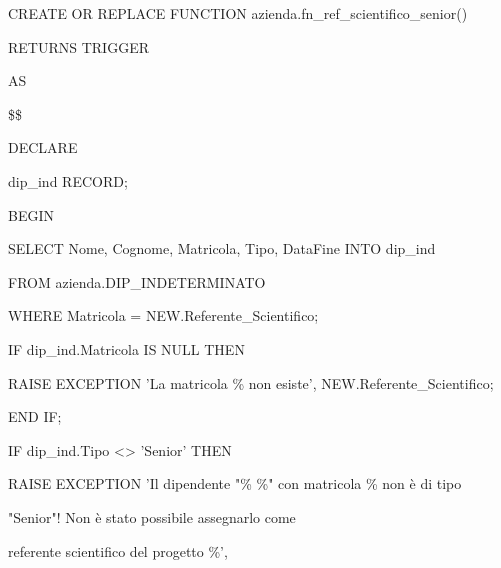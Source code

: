     \ttfamily
        \begin{flushleft}
            \begin{description}
                \item CREATE OR REPLACE FUNCTION azienda.fn\_ref\_scientifico\_senior()
                \item RETURNS TRIGGER
                \item AS
                \item \$\$
                \item DECLARE
                \begin{description}
                    \item dip\_ind RECORD;
                \end{description}
                \item BEGIN
                \begin{description}
                    \item SELECT Nome, Cognome, Matricola, Tipo, DataFine	INTO dip\_ind
                    \item FROM azienda.DIP\_INDETERMINATO
                    \item WHERE Matricola = NEW.Referente\_Scientifico;
                    \item 
                    \item IF dip\_ind.Matricola IS NULL THEN
                    \vspace{0.2cm}
                    \begin{description}
                        \item RAISE EXCEPTION 'La matricola \% non esiste', NEW.Referente\_Scientifico;
                    \end{description}
                    \item END IF;
                    \item 
                    \item IF dip\_ind.Tipo <> 'Senior' THEN
                    \vspace{0.2cm}
                    \begin{description}
                        \item RAISE EXCEPTION 'Il dipendente "\% \%" con matricola \% non è di tipo
                        \item \hspace{3cm}"Senior"! Non è stato possibile assegnarlo come
                        \item \hspace{3cm}referente scientifico del progetto \%',

\end{description}
\end{description}
\end{description}
\end{flushleft}
